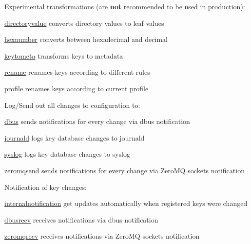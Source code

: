 Experimental transformations (are {\bfseries not} recommended to be used in production)\+:


\begin{DoxyItemize}
\item \hyperlink{autotoc_md170_src_plugins_directoryvalue_README_md}{directoryvalue} converts directory values to leaf values
\item \hyperlink{autotoc_md257_src_plugins_hexnumber_README_md}{hexnumber} converts between hexadecimal and decimal
\item \hyperlink{autotoc_md333_src_plugins_keytometa_README_md}{keytometa} transforms keys to metadata
\item \hyperlink{autotoc_md563_src_plugins_rename_README_md}{rename} renames keys according to different rules
\item \hyperlink{autotoc_md502_src_plugins_profile_README_md}{profile} renames keys according to current profile
\end{DoxyItemize}

Log/\+Send out all changes to configuration to\+:


\begin{DoxyItemize}
\item \hyperlink{autotoc_md151_src_plugins_dbus_README_md}{dbus} sends notifications for every change via dbus {\ttfamily notification}
\item \hyperlink{autotoc_md315_src_plugins_journald_README_md}{journald} logs key database changes to journald
\item \hyperlink{autotoc_md626_src_plugins_syslog_README_md}{syslog} logs key database changes to syslog
\item \hyperlink{autotoc_md946_src_plugins_zeromqsend_README_md}{zeromqsend} sends notifications for every change via Zero\+MQ sockets {\ttfamily notification}
\end{DoxyItemize}

Notification of key changes\+:


\begin{DoxyItemize}
\item \hyperlink{autotoc_md285_src_plugins_internalnotification_README_md}{internalnotification} get updates automatically when registered keys were changed
\item \hyperlink{autotoc_md163_src_plugins_dbusrecv_README_md}{dbusrecv} receives notifications via dbus {\ttfamily notification}
\item \hyperlink{autotoc_md940_src_plugins_zeromqrecv_README_md}{zeromqrecv} receives notifications via Zero\+MQ sockets {\ttfamily notification}
\end{DoxyItemize}

